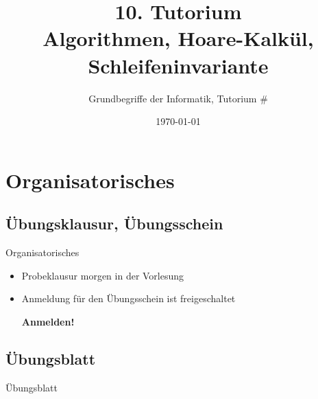 




\usepackage{tcolorbox}

\newcommand{\HTB}[1]{\ensuremath{\colorbox{lightgray!90}{\{ #1 \}}}}
\newcommand{\HT}[3]{\ensuremath{\HTB{#1} \; #2 \; \HTB{#3}}}


\title[Algorithmen]{10. Tutorium\\ Algorithmen, Hoare-Kalkül, Schleifeninvariante}
\subtitle{Grundbegriffe der Informatik, Tutorium \#\mytutnumber}
\date{\today}


\titleframe
\roadmap

\section{Organisatorisches}
\subsection{Übungsklausur, Übungsschein}
\begin{frame}{Organisatorisches}
\begin{itemize}
	\item Probeklausur morgen in der Vorlesung
	\item Anmeldung für den Übungsschein ist freigeschaltet\\
			\centerline{\textbf{Anmelden!}}
\end{itemize}
\end{frame}

\subsection{Übungsblatt}
\begin{frame}{Übungsblatt}
    \Stephan{}
    \Alex{}
\end{frame}




